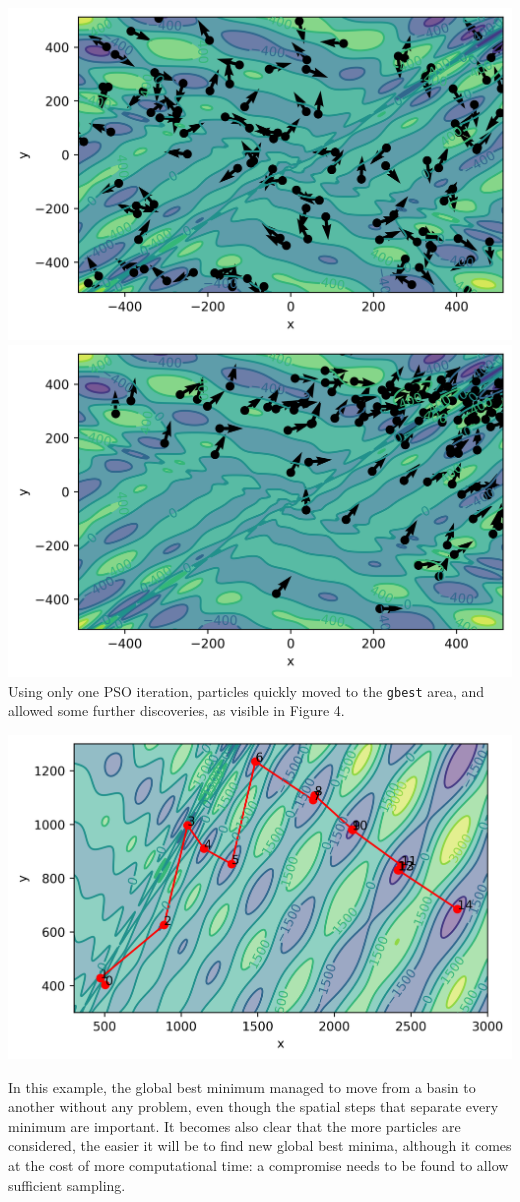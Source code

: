\documentclass[11pt]{article}
\begin{document}
\begin{multicols}{2}
\noindent\includegraphics[width=0.5\columnwidth]{figures/ite0.png}\includegraphics[width=0.5\columnwidth]{figures/ite1.png}
\medskip
Using only one PSO iteration, particles quickly moved to the \verb+gbest+ area, and allowed some further discoveries, as visible in Figure 4.
\bigskip

\noindent\begin{center}
    \includegraphics[width=0.9\columnwidth]{figures/eggholder.png}
\end{center} \medskip 
In this example, the global best minimum managed to move from a basin to another without any problem, even though the spatial steps that separate every minimum are important. It becomes also clear that the more particles are considered, the easier it will be to find new global best minima, although it comes at the cost of more computational time: a compromise needs to be found to allow sufficient sampling.


\end{multicols}
\end{document}
